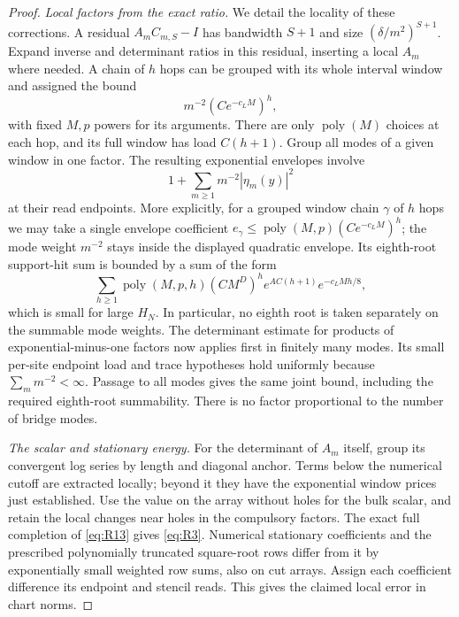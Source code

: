 \begin{proof}
\emph{Local factors from the exact ratio.}
We detail the locality of these corrections.  A residual
$A_mC_{m,S}-I$ has bandwidth $S+1$ and size
$(\delta/m^2)^{S+1}$.  Expand inverse and determinant ratios in this
residual, inserting a local $A_m$ where needed.  A chain of $h$ hops can
be grouped with its whole interval window and assigned the bound
\[
 m^{-2}(Ce^{-c_LM})^h,
\]
with fixed $M,p$ powers for its arguments.  There are only
$\operatorname{poly}(M)$ choices at each hop, and its full window has
load $C(h+1)$.  Group all modes of a given window in one factor.  The
resulting exponential envelopes involve
\[
 1+\sum_{m\ge1}m^{-2}|\eta_m(y)|^2
\]
at their read endpoints.  More explicitly, for a grouped window chain
$\gamma$ of $h$ hops we may take a single envelope coefficient
$e_\gamma\le\operatorname{poly}(M,p)(Ce^{-c_LM})^h$; the mode weight
$m^{-2}$ stays inside the displayed quadratic envelope.  Its
eighth-root support-hit sum is bounded by a sum of the form
\[
 \sum_{h\ge1}\operatorname{poly}(M,p,h)
       (C M^D)^h e^{AC(h+1)}e^{-c_LMh/8},
\]
which is small for large $H_N$.  In particular, no eighth root is taken
separately on the summable mode weights.  The determinant estimate for
products of exponential-minus-one factors now applies first in finitely
many modes.  Its small per-site endpoint load and trace hypotheses hold
uniformly because $\sum_m m^{-2}<\infty$.  Passage to all modes gives
the same joint bound, including the required eighth-root summability.
There is no factor proportional to the number of bridge modes.

\emph{The scalar and stationary energy.}
For the determinant of $A_m$ itself, group its convergent log series by
length and diagonal anchor.  Terms below the numerical cutoff are
extracted locally; beyond it they have the exponential window prices
just established.  Use the value on the array without holes for the
bulk scalar, and retain the local changes near holes in the compulsory
factors.  The exact full completion of \eqref{eq:R13} gives
\eqref{eq:R3}.  Numerical stationary coefficients and the prescribed
polynomially truncated square-root rows differ from it by exponentially
small weighted row sums, also on cut arrays.  Assign each coefficient
difference its endpoint and stencil reads.  This gives the claimed
local error in chart norms.


\end{proof}
